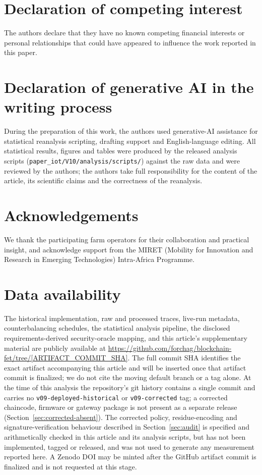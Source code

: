 \section*{Declaration of competing interest}

The authors declare that they have no known competing financial interests or personal relationships that could have appeared to influence the work reported in this paper.

\section*{Declaration of generative AI in the writing process}

During the preparation of this work, the authors used generative-AI assistance for statistical reanalysis scripting, drafting support and English-language editing. All statistical results, figures and tables were produced by the released analysis scripts (\texttt{paper\_iot/V10/analysis/scripts/}) against the raw data and were reviewed by the authors; the authors take full responsibility for the content of the article, its scientific claims and the correctness of the reanalysis.

\section*{Acknowledgements}

We thank the participating farm operators for their collaboration and practical insight, and acknowledge support from the MIRET (Mobility for Innovation and Research in Emerging Technologies) Intra-Africa Programme.

\section*{Data availability}
\label{sec:data-availability}

The historical implementation, raw and processed traces, live-run metadata, counterbalancing schedules, the statistical analysis pipeline, the disclosed requirements-derived security-oracle mapping, and this article's supplementary material are publicly available at \url{https://github.com/forchag/blockchain-fet/tree/[ARTIFACT_COMMIT_SHA]}. The full commit SHA identifies the exact artifact accompanying this article and will be inserted once that artifact commit is finalized; we do not cite the moving default branch or a tag alone. At the time of this analysis the repository's git history contains a single commit and carries no \texttt{v09-deployed-historical} or \texttt{v09-corrected} tag; a corrected chaincode, firmware or gateway package is not present as a separate release (Section~\ref{sec:corrected-absent}). The corrected policy, residue-encoding and signature-verification behaviour described in Section~\ref{sec:audit} is specified and arithmetically checked in this article and its analysis scripts, but has not been implemented, tagged or released, and was not used to generate any measurement reported here. A Zenodo DOI may be minted after the GitHub artifact commit is finalized and is not requested at this stage.
